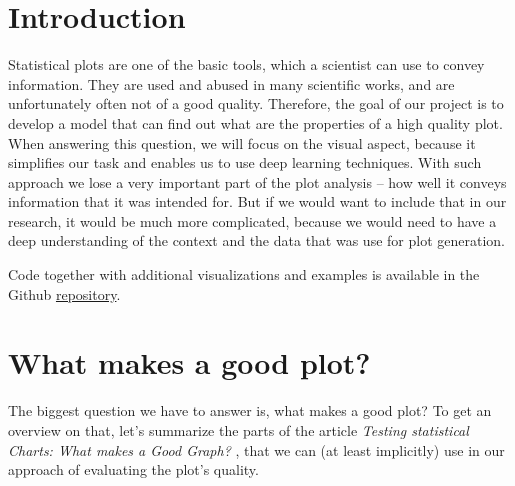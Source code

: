 \documentclass[fleqn,moreauthors,10pt]{ds_report}
\affiliation{\textit{Advisors: Assoc. Prof. dr. Erik Štrumbelj , Assoc. Prof. dr. Tomaž Curk}}
\begin{document}
\flushbottom

\maketitle

\thispagestyle{empty}


\section*{Introduction}
Statistical plots are one of the basic tools, which a scientist can use to convey information. They are used and abused in many scientific works, and are unfortunately often not of a good quality. Therefore, the goal of our project is to develop a model that can find out what are the properties of a high quality plot. When answering this question, we will focus on the visual aspect, because it simplifies our task and enables us to use deep learning techniques. With such approach we lose a very important part of the plot analysis -- how well it conveys information that it was intended for. But if we would want to include that in our research, it would be much more complicated, because we would need to have a deep understanding of the context and the data that was use for plot generation.

Code together with additional visualizations and examples is available in the Github \href{https://github.com/AndrejHafner/how-good-is-my-plot}{repository}.



\section*{What makes a good plot?}
The biggest question we have to answer is, what makes a good plot? To get an overview on that, let's summarize the parts of the article \emph{Testing statistical Charts: What makes a Good Graph?} \cite{Whatmakesagoodplot}, that we can (at least implicitly) use in our approach of evaluating the plot's quality.
\end{document}
